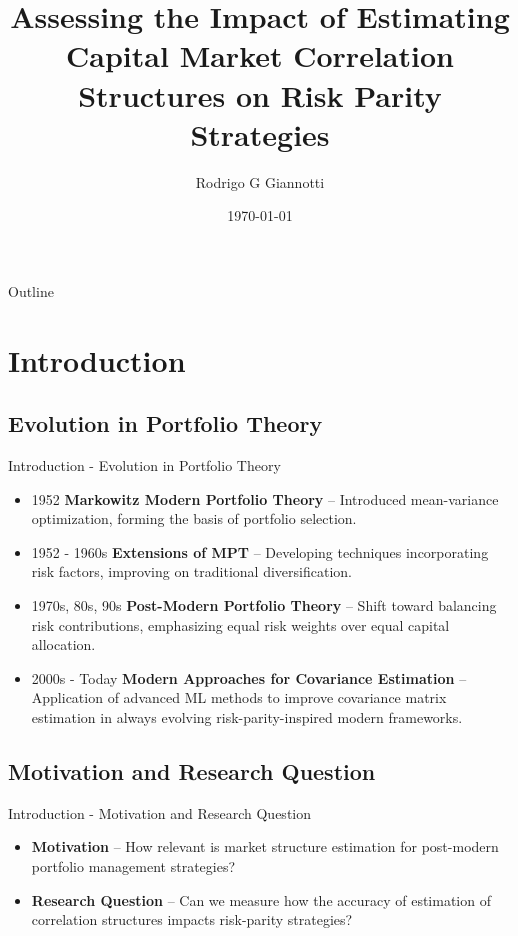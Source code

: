 \documentclass{beamer}
\title{Assessing the Impact of Estimating Capital Market Correlation Structures on Risk Parity Strategies}
\author{Rodrigo G Giannotti}
\institute{MPE - EESP FGV}
\date{\today}
\begin{document}
\begin{frame}
    \titlepage
\end{frame}

\begin{frame}{Outline}
    \tableofcontents
\end{frame}

\section{Introduction}
\subsection{Evolution in Portfolio Theory}
\begin{frame}{Introduction - Evolution in Portfolio Theory}
    \begin{itemize}
        \item 1952 \textbf{Markowitz Modern Portfolio Theory} – Introduced mean-variance optimization, forming the basis of portfolio selection.
        
        \item 1952 - 1960s \textbf{Extensions of MPT} – Developing techniques incorporating risk factors, improving on traditional diversification.
        
        \item 1970s, 80s, 90s \textbf{Post-Modern Portfolio Theory} – Shift toward balancing risk contributions, emphasizing equal risk weights over equal capital allocation.
        
        \item 2000s - Today \textbf{Modern Approaches for Covariance Estimation} – Application of advanced ML methods to improve covariance matrix estimation in always evolving risk-parity-inspired modern frameworks.
    \end{itemize}
\end{frame}

\subsection{Motivation and Research Question}
\begin{frame}{Introduction - Motivation and Research Question}
    \begin{itemize}
        \item \textbf{Motivation} – How relevant is market structure estimation for post-modern portfolio management strategies?
        \item \textbf{Research Question} – Can we measure how the accuracy of estimation of correlation structures impacts risk-parity strategies?
    \end{itemize}
\end{frame}
\end{document}
